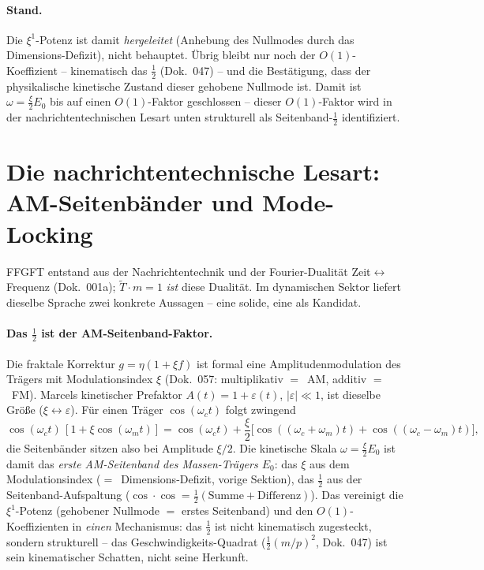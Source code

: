 \paragraph{Stand.} Die $\xi^1$-Potenz ist damit \emph{hergeleitet} (Anhebung des Nullmodes durch das
Dimensions-Defizit), nicht behauptet. Übrig bleibt nur noch der $O(1)$-Koeffizient -- kinematisch das
$\tfrac12$ (Dok.~047) -- und die Bestätigung, dass der physikalische kinetische Zustand dieser
gehobene Nullmode ist. Damit ist $\omega=\tfrac{\xi}{2}E_0$ bis auf einen $O(1)$-Faktor geschlossen --
dieser $O(1)$-Faktor wird in der nachrichtentechnischen Lesart unten strukturell als Seitenband-$\tfrac12$
identifiziert.

\section{Die nachrichtentechnische Lesart: AM-Seitenbänder und Mode-Locking}
FFGFT entstand aus der Nachrichtentechnik und der Fourier-Dualität Zeit$\leftrightarrow$Frequenz
(Dok.~001a); $\tilde T\!\cdot\! m=1$ \emph{ist} diese Dualität. Im dynamischen Sektor liefert dieselbe
Sprache zwei konkrete Aussagen -- eine solide, eine als Kandidat.

\paragraph{Das $\tfrac12$ ist der AM-Seitenband-Faktor.} Die fraktale Korrektur $g=\eta(1+\xi f)$ ist
formal eine Amplitudenmodulation des Trägers mit Modulationsindex $\xi$ (Dok.~057: multiplikativ $=$~AM,
additiv $=$~FM). Marcels kinetischer Prefaktor $A(t)=1+\varepsilon(t)$, $|\varepsilon|\ll1$, ist
dieselbe Größe ($\xi\leftrightarrow\varepsilon$). Für einen Träger $\cos(\omega_c t)$ folgt zwingend
\begin{equation}
\cos(\omega_c t)\,[1+\xi\cos(\omega_m t)]
=\cos(\omega_c t)+\frac{\xi}{2}\big[\cos((\omega_c{+}\omega_m)t)+\cos((\omega_c{-}\omega_m)t)\big],
\end{equation}
die Seitenbänder sitzen also bei Amplitude $\xi/2$. Die kinetische Skala $\omega=\tfrac{\xi}{2}E_0$ ist
damit das \emph{erste AM-Seitenband des Massen-Trägers $E_0$}: das $\xi$ aus dem Modulationsindex
($=$~Dimensions-Defizit, vorige Sektion), das $\tfrac12$ aus der Seitenband-Aufspaltung
($\cos\!\cdot\!\cos=\tfrac12(\text{Summe}+\text{Differenz})$). Das vereinigt die $\xi^1$-Potenz
(gehobener Nullmode $=$ erstes Seitenband) und den $O(1)$-Koeffizienten in \emph{einen} Mechanismus:
das $\tfrac12$ ist nicht kinematisch zugesteckt, sondern strukturell -- das Geschwindigkeits-Quadrat
($\tfrac12(m/p)^2$, Dok.~047) ist sein kinematischer Schatten, nicht seine Herkunft.

